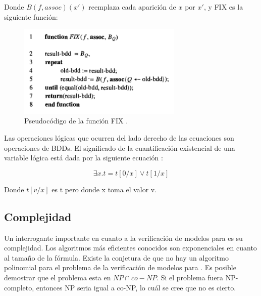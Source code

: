 \noindent Donde $B(f,assoc)(x')$ reemplaza cada aparición de $x$ por $x'$, y FIX es la siguiente función:
\begin{figure}[H]
  \centering
  \includegraphics[width=0.7\textwidth]{Figures/fix.png}
  \caption{Pseudocódigo de la función FIX \cite{Clarke:1}.}
  \label{fig:fix}
\end{figure}

\noindent Las operaciones lógicas que ocurren del lado derecho de las ecuaciones son operaciones de BDDs. El significado de la cuantificación existencial de una variable lógica está dada por la siguiente ecuación \cite{Andersen:7} :

\[ \exists x . t = t[0/x] \lor t[1/x]\] 

Donde $t[v/x]$ es t pero donde x toma el valor v.

\subsection{Complejidad}

Un interrogante importante en cuanto a la verificación de modelos para {\mucalculo} es su complejidad. Los algoritmos más eficientes conocidos son exponenciales en cuanto al tamaño de la fórmula. Existe la conjetura\cite{Clarke:1} de que no hay un algoritmo polinomial para el problema de la verificación de modelos para {\mucalculo}. Es posible demostrar que el problema esta en $NP \cap co-NP$. Si el problema fuera NP-completo, entonces NP seria igual a co-NP, lo cuál se cree que no es cierto.
